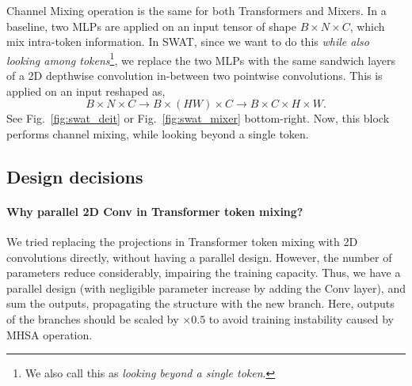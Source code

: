 \documentclass[10pt,twocolumn,letterpaper]{article}
\newcommand{\fref}[1]{Fig.~\ref{#1}}
\begin{document}
Channel Mixing operation is the same for both Transformers and Mixers. In a baseline, two MLPs are applied on an input tensor of shape $B\times N\times C$, which mix intra-token information. In SWAT, since we want to do this \textit{while also looking among tokens}\footnote{We also call this as \textit{looking beyond a single token}.}, we replace the two MLPs with the same sandwich layers of a 2D depthwise convolution in-between two pointwise convolutions. This is applied on an input reshaped as,
\begin{equation*}
	B\times N\times C \rightarrow B\times (HW)\times C \rightarrow B\times C\times H\times W.
\end{equation*}
\noindent See \fref{fig:swat_deit} or \fref{fig:swat_mixer} bottom-right. Now, this block performs channel mixing, while looking beyond a single token.


\subsection{Design decisions}

\paragraph{Why parallel 2D Conv in Transformer token mixing?} We tried replacing the projections in Transformer token mixing with 2D convolutions directly, without having a parallel design. However, the number of parameters reduce considerably, impairing the training capacity. Thus, we have a parallel design (with negligible parameter increase by adding the Conv layer), and sum the outputs, propagating the structure with the new branch. Here, outputs of the branches should be scaled by $\times0.5$ to avoid training instability caused by MHSA operation.  
\end{document}
